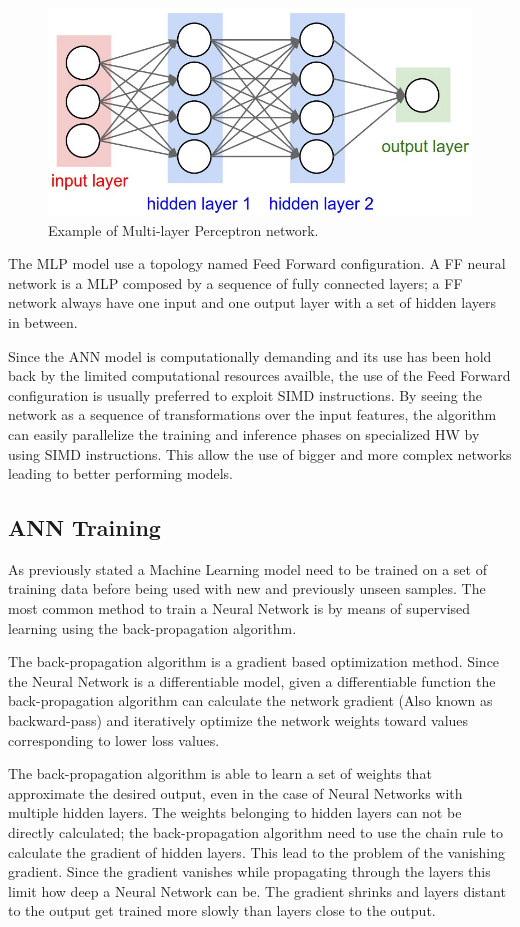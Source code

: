 \documentclass[../main.tex]{subfiles}
\begin{document}
\begin{figure}[h!]
  \centering
  \includegraphics[width=.6\linewidth]{images/neural_net2.jpeg}
  \caption{Example of Multi-layer Perceptron network. \cite{CS231n}}
  \label{fig:MLP}
\end{figure}

The MLP model use a topology named Feed Forward configuration. 
A FF neural network is a MLP composed by a sequence of fully connected layers; a FF network always have one input and one output layer with a set of hidden layers in between.

Since the ANN model is computationally demanding and its use has been hold back by the limited computational resources availble, the use of the Feed Forward configuration is usually preferred to exploit SIMD instructions.
By seeing the network as a sequence of transformations over the input features, the algorithm can easily parallelize the training and inference phases on specialized HW by using SIMD instructions.
This allow the use of bigger and more complex networks leading to better performing models.


\subsection{ANN Training}
As previously stated a Machine Learning model need to be trained on a set of training data before being used with new and previously unseen samples.
The most common method to train a Neural Network is by means of supervised learning using the back-propagation algorithm.

The back-propagation algorithm is a gradient based optimization method.
Since the Neural Network is a differentiable model, given a differentiable function the back-propagation algorithm can calculate the network gradient (Also known as backward-pass) and iteratively optimize the network weights toward values corresponding to lower loss values.

The back-propagation algorithm is able to learn a set of weights that approximate the desired output, even in the case of Neural Networks with multiple hidden layers.
The weights belonging to hidden layers can not be directly calculated; the back-propagation algorithm need to use the chain rule to calculate the gradient of hidden layers.
This lead to the problem of the vanishing gradient.
Since the gradient vanishes while propagating through the layers this limit how deep a Neural Network can be. 
The gradient shrinks and layers distant to the output get trained more slowly than layers close to the output.
\end{document}
